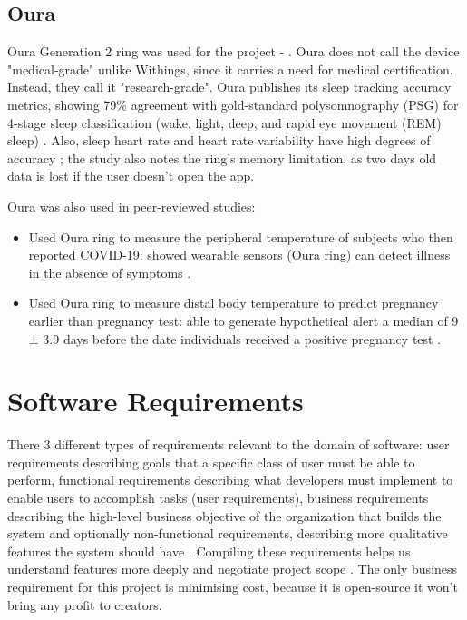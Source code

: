 \subsection{Oura}
\label{section:OuraRing}
Oura Generation 2 ring was used for the project - \cite{ouraStorePage}. Oura does not call the device "medical-grade" unlike Withings, since it carries a need for medical certification. Instead, they call it "research-grade". Oura publishes its sleep tracking accuracy metrics, showing 79\% agreement with gold-standard polysomnography (PSG) for 4-stage sleep classification (wake, light, deep, and rapid eye movement (REM) sleep) \cite{OuraSleepAcc}. Also, sleep heart rate and heart rate variability have high degrees of accuracy \cite{ouraHeartAcc}; the study also notes the ring's memory limitation, as two days old data is lost if the user doesn't open the app. 

Oura was also used in peer-reviewed studies:
\begin{itemize}
    \item Used Oura ring to measure the peripheral temperature of subjects who then reported COVID-19: showed wearable sensors (Oura ring) can detect illness in the absence of symptoms \cite{smarr2020feasibility}.
    \item Used Oura ring to measure distal body temperature to predict pregnancy earlier than pregnancy test: able to generate hypothetical alert a median of 9 ± 3.9 days before the date individuals received a positive pregnancy test \cite{ouraPregnancy}.
\end{itemize}
\section{Software Requirements}
There 3 different types of requirements relevant to the domain of software: user requirements describing goals that a specific class of user must be able to perform, functional requirements describing what developers must implement to enable users to accomplish tasks (user requirements), business requirements describing the high-level business objective of the organization that builds the system and optionally non-functional requirements, describing more qualitative features the system should have \cite{wiegers2013software}. Compiling these requirements helps us understand features more deeply and negotiate project scope \cite{Damian2006An}. The only business requirement for this project is minimising cost, because it is open-source it won't bring any profit to creators.

